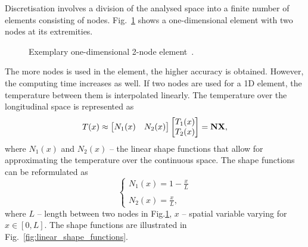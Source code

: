 Discretisation involves a division of the analysed space into a finite number of elements consisting of nodes. Fig.~\ref{fig:1d_element} shows a one-dimensional element with two nodes at its extremities. 

\begin{figure}[H]
    \centering
    \caption{Exemplary one-dimensional 2-node element~\cite{eth_introduction_to_finite_element}.}
    \label{fig:1d_element}
\end{figure}

The more nodes is used in the element, the higher accuracy is obtained. However, the computing time increases as well. If two nodes are used for a 1D element, the temperature between them is interpolated linearly. The temperature over the longitudinal space is represented as
\begin{equation}
    T(x) \approx    
    \begin{bmatrix}  
    N_1(x) & N_2(x)    
    \end{bmatrix} 
    \begin{bmatrix}  
    T_1(x) \\  T_2(x) 
    \end{bmatrix} 
    = \textbf{N} \textbf{X}, 
    \label{eqn:linear_shape_function}
\end{equation}
where $N_1(x)$ and $N_2(x)$ -- the linear shape functions that allow for approximating the temperature over the continuous space. The shape functions can be reformulated as 
\begin{equation}
    \left\{ \begin{array}{ lll }
    N_1(x) = 1 - \frac{x}{L} \\ \\
    N_2(x) = \frac{x}{L},
    \end{array} \right.
    \label{eqn:shape_functions_representation}
\end{equation}
where $L$ -- length between two nodes in Fig.\ref{fig:1d_element}, $x$ -- spatial variable varying for $x \in [0, L]$. The shape functions are illustrated in Fig.~\ref{fig:linear_shape_functions}.


